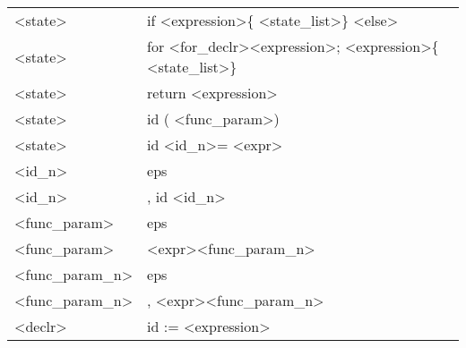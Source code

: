 \documentclass{article}
\begin{document}
\begin{table}[]
\begin{tabular}{l|l}
\textless{}state\textgreater{}          & if \textless{}expression\textgreater \{ \textless{}state\_list\textgreater \} \textless{}else\textgreater{}                                          \\
\textless{}state\textgreater{}          & for \textless{}for\_declr\textgreater \textless{}expression\textgreater ; \textless{}expression\textgreater \{ \textless{}state\_list\textgreater \} \\
\textless{}state\textgreater{}          & return \textless{}expression\textgreater{}                                                                                                           \\
\textless{}state\textgreater{}          & id ( \textless{}func\_param\textgreater )                                                                                                            \\
\textless{}state\textgreater{}          & id \textless{}id\_n\textgreater = \textless{}expr\textgreater{}                                                                                      \\
\textless{}id\_n\textgreater{}          & eps                                                                                                                                                  \\
\textless{}id\_n\textgreater{}          & , id \textless{}id\_n\textgreater{}                                                                                                                  \\
\textless{}func\_param\textgreater{}    & eps                                                                                                                                                  \\
\textless{}func\_param\textgreater{}    & \textless{}expr\textgreater \textless{}func\_param\_n\textgreater{}                                                                                  \\
\textless{}func\_param\_n\textgreater{} & eps                                                                                                                                                  \\
\textless{}func\_param\_n\textgreater{} & , \textless{}expr\textgreater \textless{}func\_param\_n\textgreater{}                                                                                \\
\textless{}declr\textgreater{}          & id := \textless{}expression\textgreater{}                                                                                                            \\

\end{tabular}
\end{table}
\end{document}
